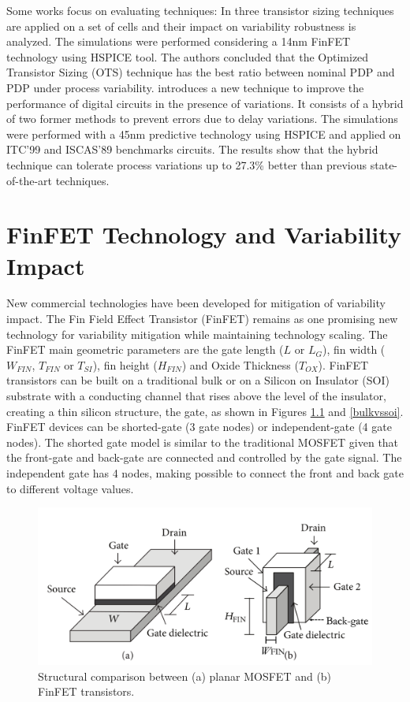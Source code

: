 \documentclass[pgmicro,mestrado,english]{iiufrgs}
\begin{document}
Some works focus on evaluating techniques: In \cite{zimpeck2016finfet} three transistor sizing techniques are applied on a set of cells and their impact on variability robustness is analyzed. The simulations were performed considering a 14nm FinFET technology using HSPICE tool. The authors concluded that the Optimized Transistor Sizing (OTS) technique has the best ratio between nominal PDP and PDP under process variability.
\cite{ahmadi2017hybrid} introduces a new technique to improve the performance of digital circuits in the presence of variations. It consists of a hybrid of two former methods to prevent errors due to delay variations. The simulations were performed with a 45nm predictive technology using HSPICE and applied on ITC’99 and ISCAS’89 benchmarks circuits. The results show that the hybrid technique can tolerate process variations up to 27.3\% better than previous state-of-the-art techniques.

\chapter{FinFET Technology and Variability Impact}
    New commercial technologies have been developed for mitigation of variability impact. The Fin Field Effect Transistor (FinFET) remains as one promising new technology for variability mitigation while maintaining technology scaling. The FinFET main geometric parameters are the gate length ($L$ or $L_G$), fin width ($W_{FIN}$, $T_{FIN}$ or $T_{SI}$), fin height ($H_{FIN}$) and Oxide Thickness ($T_{OX}$). FinFET transistors can be built on a traditional bulk or on a Silicon on Insulator (SOI) substrate with a conducting channel that rises above the level of the insulator, creating a thin silicon structure, the gate, as shown in Figures \ref{mosfetvsfinfet} and \ref{bulkvssoi}. FinFET devices can be shorted-gate (3 gate nodes) or independent-gate (4 gate nodes). The shorted gate model is similar to the traditional MOSFET given that the front-gate and back-gate are connected and controlled by the gate signal. The independent gate has 4 nodes, making possible to connect the front and back gate to different voltage values.

    \begin{figure} [H]
        \centering
	    \includegraphics[width=\textwidth, trim={0 0 0 0},clip]{finfet.pdf}
        \caption{Structural comparison between (a) planar MOSFET and (b) FinFET transistors.}
        \label{mosfetvsfinfet}
    \end{figure}
\end{document}
